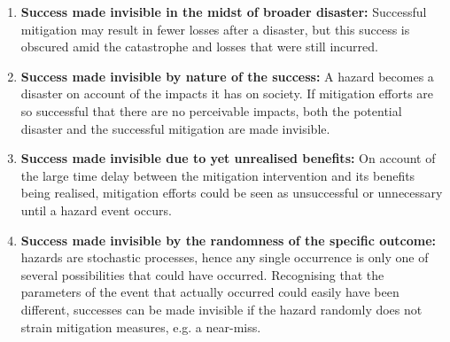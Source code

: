     \begin{enumerate}
    \item \textbf{Success made invisible in the midst of broader disaster:} Successful mitigation may result in fewer losses after a disaster, but this success is obscured amid the catastrophe and losses that were still incurred.
    
    \item \textbf{Success made invisible by nature of the success:} A hazard becomes a disaster on account of the impacts it has on society. If mitigation efforts are so successful that there are no perceivable impacts, both the potential disaster and the successful mitigation are made invisible.
    
    \item \textbf{Success made invisible due to yet unrealised benefits:} On account of the large time delay between the mitigation intervention and its benefits being realised, mitigation efforts could be seen as unsuccessful or unnecessary until a hazard event occurs.
    
    \item \textbf{Success made invisible by the randomness of the specific outcome:} hazards are stochastic processes, hence any single occurrence is only one of several possibilities that could have occurred. Recognising that the parameters of the event that actually occurred could easily have been different, successes can be made invisible if the hazard randomly does not strain mitigation measures, e.g. a near-miss.   
    \end{enumerate}

